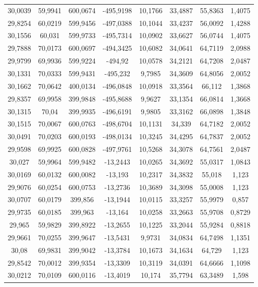 \begin{longtable}{@{}cccccccc@{}}
30,0039 & 59,9941 & 600,0674 & -495,9198 & 10,1766 & 33,4887 & 55,8363 & 1,4075 \\
29,8254 & 60,0219 & 599,9456 & -497,0388 & 10,1044 & 33,4237 & 56,0092 & 1,4288 \\
30,1556 & 60,031 & 599,9733 & -495,7314 & 10,0902 & 33,6627 & 56,0744 & 1,4075 \\
29,7888 & 70,0173 & 600,0697 & -494,3425 & 10,6082 & 34,0641 & 64,7119 & 2,0988 \\
29,9799 & 69,9936 & 599,9224 & -494,92 & 10,0578 & 34,2121 & 64,7208 & 2,0487 \\
30,1331 & 70,0333 & 599,9431 & -495,232 & 9,7985 & 34,3609 & 64,8056 & 2,0052 \\
30,1662 & 70,0642 & 400,0134 & -496,0848 & 10,0918 & 33,3564 & 66,112 & 1,3868 \\
29,8357 & 69,9958 & 399,9848 & -495,8688 & 9,9627 & 33,1354 & 66,0814 & 1,3668 \\
30,1315 & 70,04 & 399,9935 & -496,6191 & 9,9805 & 33,3162 & 66,0898 & 1,3848 \\
30,1515 & 70,0067 & 600,0763 & -498,6704 & 10,1131 & 34,339 & 64,7182 & 2,0052 \\
30,0491 & 70,0203 & 600,0193 & -498,0134 & 10,3245 & 34,4295 & 64,7837 & 2,0052 \\
29,9598 & 69,9925 & 600,0828 & -497,9761 & 10,5268 & 34,3078 & 64,7561 & 2,0487 \\
30,027 & 59,9964 & 599,9482 & -13,2443 & 10,0265 & 34,3692 & 55,0317 & 1,0843 \\
30,0169 & 60,0132 & 600,0082 & -13,193 & 10,2317 & 34,3832 & 55,018 & 1,123 \\
29,9076 & 60,0254 & 600,0753 & -13,2736 & 10,3689 & 34,3098 & 55,0008 & 1,123 \\
30,0707 & 60,0179 & 399,856 & -13,1944 & 10,0115 & 33,3257 & 55,9979 & 0,857 \\
29,9735 & 60,0185 & 399,963 & -13,164 & 10,0258 & 33,2663 & 55,9708 & 0,8729 \\
29,965 & 59,9829 & 399,8922 & -13,2655 & 10,1225 & 33,2044 & 55,9284 & 0,8818 \\
29,9661 & 70,0255 & 399,9647 & -13,5431 & 9,9731 & 34,0834 & 64,7498 & 1,1351 \\
30,08 & 69,9831 & 399,9042 & -13,3784 & 10,1673 & 34,1634 & 64,729 & 1,123 \\
29,8542 & 70,0012 & 399,9354 & -13,3309 & 10,3119 & 34,0391 & 64,6666 & 1,1098 \\
30,0212 & 70,0109 & 600,0116 & -13,4019 & 10,174 & 35,7794 & 63,3489 & 1,598 \\

\end{longtable}
